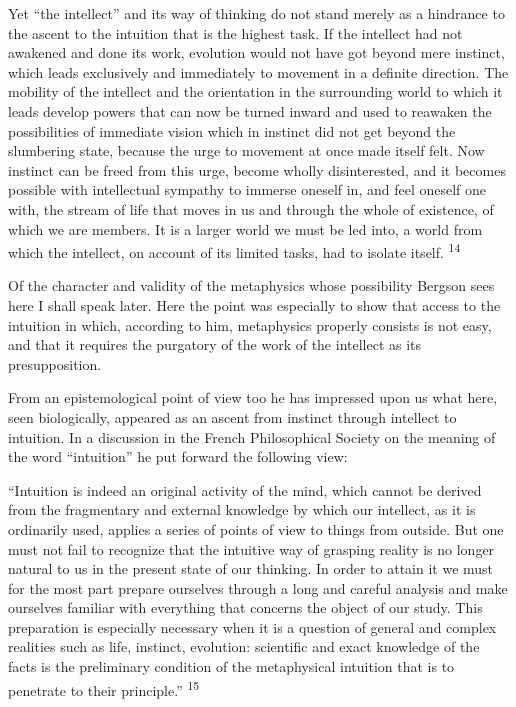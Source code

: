 \documentclass[12pt,a4paper,openany]{book}
\newcommand{\opage}[1]{\marginnote{\footnotesize\textit{[#1]}}}
\newcommand{\nm}[1]{\unskip\textsuperscript{#1}}
\begin{document}
Yet ``the intellect'' and its way of thinking do not stand
\opage{20}merely as a hindrance to the ascent to the intuition that is the highest task. If the intellect had not awakened and done its work, evolution would not have got beyond mere instinct, which leads exclusively and immediately to movement in a definite direction. The mobility of the intellect and the orientation in the surrounding world to which it leads develop powers that can now be turned inward and used to reawaken the possibilities of immediate vision which in instinct did not get beyond the slumbering state, because the urge to movement at once made itself felt. Now instinct can be freed from this urge, become wholly disinterested, and it becomes possible with intellectual sympathy to immerse oneself in, and feel oneself one with, the stream of life that moves in us and through the whole of existence, of which we are members. It is a larger world we must be led into, a world from which the intellect, on account of its limited tasks, had to isolate itself. \nm{14}

Of the character and validity of the metaphysics whose possibility Bergson sees here I shall speak later. Here the point was especially to show that access to the intuition in which, according to him, metaphysics properly consists is not easy, and that it requires the purgatory of the work of the intellect as its presupposition.

From an epistemological point of view too he has impressed upon us what here, seen biologically, appeared as an ascent from instinct through intellect to intuition. In a discussion in the French Philosophical Society on the meaning of the word ``intuition'' he put forward the following view:

``Intuition is indeed an original activity of the mind, which cannot be derived from the fragmentary and external knowledge by which our intellect, as it is ordinarily used, applies a series of points of view to things from outside. But one must not fail to recognize that the intuitive way of grasping reality is no longer natural to us in the present state of our thinking. In order to attain it we must for the most part prepare ourselves through a long and careful analysis and make ourselves familiar with everything that concerns the object of our study. This preparation is especially necessary when it is a question
\opage{21}of general and complex realities such as life, instinct, evolution: scientific and exact knowledge of the facts is the preliminary condition of the metaphysical intuition that is to penetrate to their principle.'' \nm{15}
\end{document}
